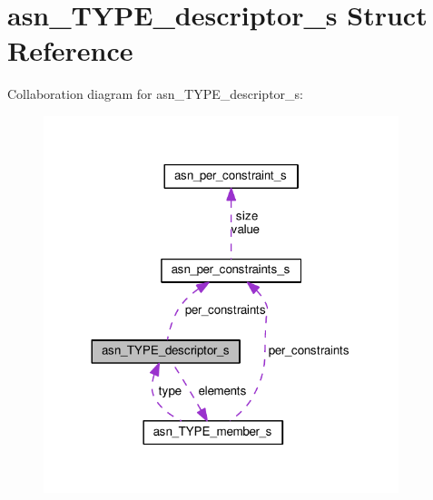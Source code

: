 \hypertarget{structasn__TYPE__descriptor__s}{}\section{asn\+\_\+\+T\+Y\+P\+E\+\_\+descriptor\+\_\+s Struct Reference}
\label{structasn__TYPE__descriptor__s}


Collaboration diagram for asn\+\_\+\+T\+Y\+P\+E\+\_\+descriptor\+\_\+s\+:\nopagebreak
\begin{figure}[H]
\begin{center}
\leavevmode
\includegraphics[width=293pt]{structasn__TYPE__descriptor__s__coll__graph}
\end{center}
\end{figure}
